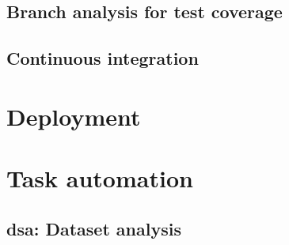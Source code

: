 \cite{woodward1980experience, gupta2000generating}

\subsection{Branch analysis for test coverage}\label{subsec:branch-analysis}



\subsection{Continuous integration}\label{subsec:continuous-integration}



\section{Deployment}\label{sec:deployment}


\cite{fowler2006continuous, duvall2007continuous}



\section{Task automation}\label{sec:task-automation}



\subsection{dsa: Dataset analysis}\label{subsec:dsa}



